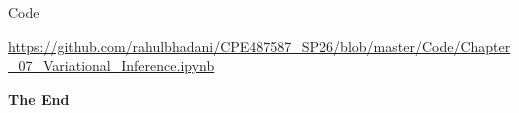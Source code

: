\documentclass[aspectratio=169,xcolor=dvipsnames,svgnames,x11names,fleqn]{beamer}
\begin{document}
\begin{frame}{Code}

\LARGE

\centering

\url{https://github.com/rahulbhadani/CPE487587_SP26/blob/master/Code/Chapter_07_Variational_Inference.ipynb}

\end{frame}



\begin{frame}
\Huge{\centerline{\color{MediumBlue}\textbf{The End}}}
\end{frame}
\end{document}
